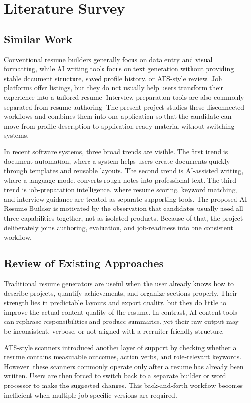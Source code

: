 \section{Literature Survey}
\subsection{Similar Work}
\noindent Conventional resume builders generally focus on data entry and visual formatting, while AI writing tools focus on text generation without providing stable document structure, saved profile history, or ATS-style review. Job platforms offer listings, but they do not usually help users transform their experience into a tailored resume. Interview preparation tools are also commonly separated from resume authoring. The present project studies these disconnected workflows and combines them into one application so that the candidate can move from profile description to application-ready material without switching systems.

\noindent In recent software systems, three broad trends are visible. The first trend is document automation, where a system helps users create documents quickly through templates and reusable layouts. The second trend is AI-assisted writing, where a language model converts rough notes into professional text. The third trend is job-preparation intelligence, where resume scoring, keyword matching, and interview guidance are treated as separate supporting tools. The proposed AI Resume Builder is motivated by the observation that candidates usually need all three capabilities together, not as isolated products. Because of that, the project deliberately joins authoring, evaluation, and job-readiness into one consistent workflow.

\subsection{Review of Existing Approaches}
\noindent Traditional resume generators are useful when the user already knows how to describe projects, quantify achievements, and organize sections properly. Their strength lies in predictable layouts and export quality, but they do little to improve the actual content quality of the resume. In contrast, AI content tools can rephrase responsibilities and produce summaries, yet their raw output may be inconsistent, verbose, or not aligned with a recruiter-friendly structure.

\noindent ATS-style scanners introduced another layer of support by checking whether a resume contains measurable outcomes, action verbs, and role-relevant keywords. However, these scanners commonly operate only after a resume has already been written. Users are then forced to switch back to a separate builder or word processor to make the suggested changes. This back-and-forth workflow becomes inefficient when multiple job-specific versions are required.

